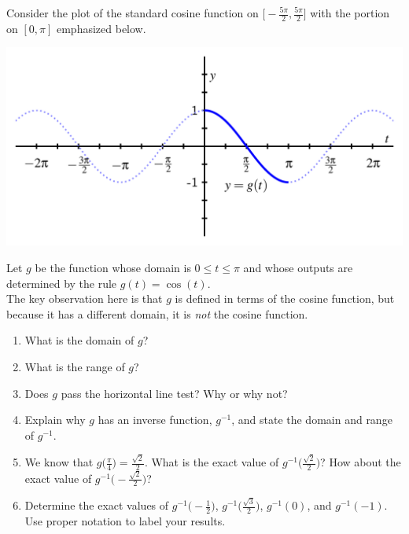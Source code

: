 \documentclass{ximera}
\begin{document}
Consider the plot of the standard cosine function on $\Big[-\frac{5\pi}{2},\frac{5\pi}{2}\Big]$ with the portion on $[0,\pi]$ emphasized below.%

\begin{image}
\includegraphics[width=0.8\linewidth]{inverse-trig-PA-cosine.png}
\end{image}

\begin{exploration}
Let $g$ be the function whose domain is $0 \leq t \leq \pi$ and whose outputs are determined by the rule $g(t) = \cos(t)$.  \\
The key observation here is that $g$ is defined in terms of the cosine function, but because it has a different domain, it is \emph{not} the cosine function.%
\par

\begin{enumerate}[label=\alph*.]
\item
What is the domain of $g$?%
\item
What is the range of $g$?%
\item
Does $g$ pass the horizontal line test? Why or why not?%
\item
Explain why $g$ has an inverse function, $g^{-1}$, and state the domain and range of $g^{-1}$.%
\item
We know that $g\Big(\frac{\pi}{4}\Big) = \frac{\sqrt{2}}{2}$. What is the exact value of $g^{-1}\bigg(\frac{\sqrt{2}}{2}\bigg)$? How about the exact value of $g^{-1}\bigg(-\frac{\sqrt{2}}{2}\bigg)$?%
\item
Determine the exact values of $g^{-1}\Big(-\frac{1}{2}\Big)$, $g^{-1}\bigg(\frac{\sqrt{3}}{2}\bigg)$, $g^{-1}(0)$, and $g^{-1}(-1)$. Use proper notation to label your results.%
\end{enumerate}
\end{exploration}

\end{document}

